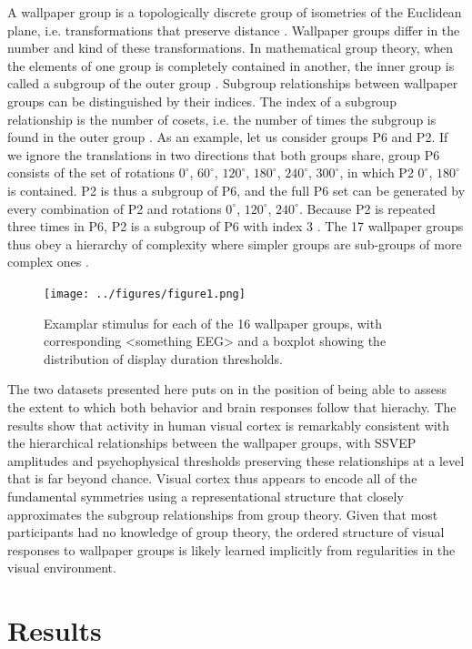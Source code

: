 \documentclass[9pt,twocolumn,twoside,lineno]{pnas-new}
\begin{document}
A wallpaper group is a topologically discrete group of isometries of the Euclidean plane, i.e. transformations that preserve distance \cite{RN1425}. Wallpaper groups differ in the number and kind of these transformations. In mathematical group theory, when the elements of one group is completely contained in another, the inner group is called a subgroup of the outer group \cite{RN1425}. Subgroup relationships between wallpaper groups can be distinguished by their indices. The index of a subgroup relationship is the number of cosets, i.e. the number of times the subgroup is found in the outer group \cite{RN1425}. As an example, let us consider groups P6 and P2. If we ignore the translations in two directions that both groups share, group P6 consists of the set of rotations {$0^{\circ}$, $60^{\circ}$, $120^{\circ}$, $180^{\circ}$, $240^{\circ}$, $300^{\circ}$}, in which P2 {$0^{\circ}$, $180^{\circ}$} is contained. P2 is thus a subgroup of P6, and the full P6 set can be generated by every combination of P2 and rotations {$0^{\circ}$, $120^{\circ}$, $240^{\circ}$}. Because P2 is repeated three times in P6, P2 is a subgroup of P6 with index 3 \cite{RN1425}. The 17 wallpaper groups thus obey a hierarchy of complexity where simpler groups are sub-groups of more complex ones \cite{RN1711}.

\begin{figure}[tb]
\centering
\texttt{[image: ../figures/figure1.png]}
\caption{Examplar stimulus for each of the 16 wallpaper groups, with corresponding <something EEG> and a boxplot showing the distribution of display duration thresholds. }
\label{fig:durations_rotations}
\end{figure}

The two datasets presented here puts on in the position of being able to assess the extent to which both behavior and brain responses follow that hierachy. The results show that activity in human visual cortex is remarkably consistent with the hierarchical relationships between the wallpaper groups, with SSVEP amplitudes and psychophysical thresholds preserving these relationships at a level that is far beyond chance. Visual cortex thus appears to encode all of the fundamental symmetries using a representational structure that closely approximates the subgroup relationships from group theory. Given that most participants had no knowledge of group theory, the ordered structure of visual responses to wallpaper groups is likely learned implicitly from regularities in the visual environment.

\section*{Results}
\end{document}
